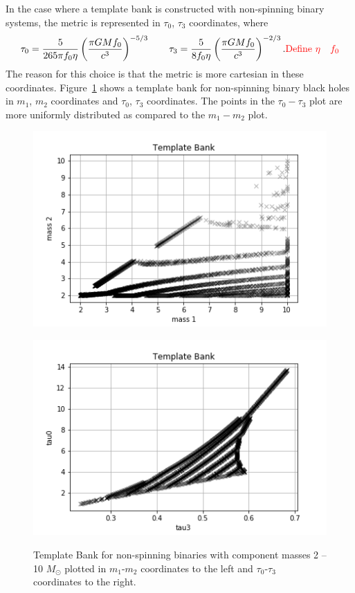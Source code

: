\documentclass{article}
\newcommand{\red}[1]{{\color{red}{#1}\xspace}}
\begin{document}
In the case where a template bank is constructed with non-spinning binary systems, the metric is represented in $\tau_0$, $\tau_3$ coordinates,
where~\cite{TmplBank}
\begin{equation}
    \tau_0 = \frac{5}{265 \pi f_0 \eta}\left(\frac{\pi G M f_0}{c^3}
    \right)^{-5/3} \qquad
     \tau_3 = \frac{5}{8 f_0 \eta} \left( \frac{\pi G M f_0}{c^3}\right)^{-2/3}.
\red{\text{Define }\eta \quad f_0}
\end{equation}
 The reason for this choice is that the metric is more cartesian in these coordinates.
 Figure~\ref{fig:mtau} shows a template bank for
non-spinning binary black holes in $m_1$, $m_2$ coordinates and $\tau_0$, $\tau_3$ coordinates. The points in the $\tau_0 - \tau_3$ plot are more uniformly distributed as compared to the $m_1 - m_2$ plot.
\begin{figure}[h]
    \begin{minipage}{0.5\textwidth}
        \includegraphics[scale=0.5]{m1m2.png}
        \label{fig:m1m2}
    \end{minipage}
    \begin{minipage}{0.5\textwidth}
        \includegraphics[scale=0.5]{tau0tau3.png}
        \label{fig:tau0tau3}
    \end{minipage}
    \caption{Template Bank for non-spinning binaries with component masses
2 -- 10 $M_{\odot}$ plotted in $m_1$-$m_2$ coordinates to the left and
$\tau_0$-$\tau_3$ coordinates to the right. \label{fig:mtau}}
\end{figure}
\end{document}
